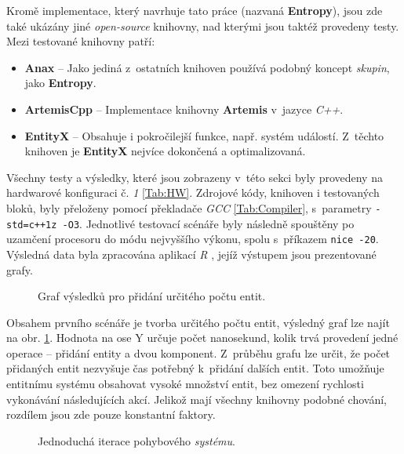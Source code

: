Kromě implementace, který navrhuje tato práce (nazvaná \textbf{Entropy}), jsou zde také ukázány jiné \emph{open-source} knihovny, nad kterými jsou taktéž provedeny testy. Mezi testované knihovny patří:
\begin{itemize}
	\item \textbf{Anax} \cite{Anax} -- Jako jediná z~ostatních knihoven používá podobný koncept \emph{skupin}, jako \textbf{Entropy}.
	\item \textbf{ArtemisCpp} \cite{ArtemisCpp} -- Implementace knihovny \textbf{Artemis} \cite{ArtemisJava} v~jazyce \emph{C++}.
	\item \textbf{EntityX} \cite{EntityX} -- Obsahuje i pokročilejší funkce, např. systém událostí. Z~těchto knihoven je \textbf{EntityX} nejvíce dokončená a optimalizovaná.
\end{itemize}

Všechny testy a výsledky, které jsou zobrazeny v~této sekci byly provedeny na hardwarové konfiguraci č. \emph{1} \ref{Tab:HW}. Zdrojové kódy, knihoven i testovaných bloků, byly přeloženy pomocí překladače \emph{GCC} \ref{Tab:Compiler}, s~parametry \texttt{-std=c++1z -O3}. Jednotlivé testovací scénáře byly následně spouštěny po uzamčení procesoru do módu nejvyššího výkonu, spolu s~příkazem \texttt{nice -20}. Výsledná data byla zpracována aplikací \emph{R} \cite{RHome}, jejíž výstupem jsou prezentované grafy.

\begin{figure}[H]
	\begin{center}
	\end{center}
	\caption{Graf výsledků pro přidání určitého počtu entit.}
	\label{Fig:EVALEntity}
\end{figure}

Obsahem prvního scénáře je tvorba určitého počtu entit, výsledný graf lze najít na obr. \ref{Fig:EVALEntity}. Hodnota na ose Y určuje počet nanosekund, kolik trvá provedení jedné operace -- přidání entity a dvou komponent. Z~průběhu grafu lze určit, že počet přidaných entit nezvyšuje čas potřebný k~přidání dalších entit. Toto umožňuje entitnímu systému obsahovat vysoké množství entit, bez omezení rychlosti vykonávání následujících akcí. Jelikož mají všechny knihovny podobné chování, rozdílem jsou zde pouze konstantní faktory.

\begin{figure}[H]
	\begin{center}
	\end{center}
	\caption{Jednoduchá iterace pohybového \emph{systému}.}
	\label{Fig:EVALMovSys}
\end{figure}


